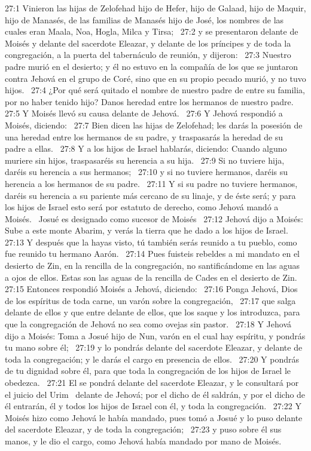 27:1 Vinieron las hijas de Zelofehad hijo de Hefer, hijo de Galaad, hijo de Maquir, hijo de Manasés, de las familias de Manasés hijo de José, los nombres de las cuales eran Maala, Noa, Hogla, Milca y Tirsa;  
27:2 y se presentaron delante de Moisés y delante del sacerdote Eleazar, y delante de los príncipes y de toda la congregación, a la puerta del tabernáculo de reunión, y dijeron:  
27:3 Nuestro padre murió en el desierto; y él no estuvo en la compañía de los que se juntaron contra Jehová en el grupo de Coré, sino que en su propio pecado murió, y no tuvo hijos.  
27:4 ¿Por qué será quitado el nombre de nuestro padre de entre su familia, por no haber tenido hijo? Danos heredad entre los hermanos de nuestro padre.  
27:5 Y Moisés llevó su causa delante de Jehová.  
27:6 Y Jehová respondió a Moisés, diciendo:  
27:7 Bien dicen las hijas de Zelofehad; les darás la posesión de una heredad entre los hermanos de su padre, y traspasarás la heredad de su padre a ellas.  
27:8 Y a los hijos de Israel hablarás, diciendo: Cuando alguno muriere sin hijos, traspasaréis su herencia a su hija.  
27:9 Si no tuviere hija, daréis su herencia a sus hermanos;  
27:10 y si no tuviere hermanos, daréis su herencia a los hermanos de su padre.  
27:11 Y si su padre no tuviere hermanos, daréis su herencia a su pariente más cercano de su linaje, y de éste será; y para los hijos de Israel esto será por estatuto de derecho, como Jehová mandó a Moisés.  
Josué es designado como sucesor de Moisés  
27:12 Jehová dijo a Moisés: Sube a este monte Abarim, y verás la tierra que he dado a los hijos de Israel.  
27:13 Y después que la hayas visto, tú también serás reunido a tu pueblo, como fue reunido tu hermano Aarón.  
27:14 Pues fuisteis rebeldes a mi mandato en el desierto de Zin, en la rencilla de la congregación, no santificándome en las aguas a ojos de ellos. Estas son las aguas de la rencilla de Cades en el desierto de Zin.  
27:15 Entonces respondió Moisés a Jehová, diciendo:  
27:16 Ponga Jehová, Dios de los espíritus de toda carne, un varón sobre la congregación,  
27:17 que salga delante de ellos y que entre delante de ellos, que los saque y los introduzca, para que la congregación de Jehová no sea como ovejas sin pastor.  
27:18 Y Jehová dijo a Moisés: Toma a Josué hijo de Nun, varón en el cual hay espíritu, y pondrás tu mano sobre él;  
27:19 y lo pondrás delante del sacerdote Eleazar, y delante de toda la congregación; y le darás el cargo en presencia de ellos.  
27:20 Y pondrás de tu dignidad sobre él, para que toda la congregación de los hijos de Israel le obedezca.  
27:21 El se pondrá delante del sacerdote Eleazar, y le consultará por el juicio del Urim  delante de Jehová; por el dicho de él saldrán, y por el dicho de él entrarán, él y todos los hijos de Israel con él, y toda la congregación.  
27:22 Y Moisés hizo como Jehová le había mandado, pues tomó a Josué y lo puso delante del sacerdote Eleazar, y de toda la congregación;  
27:23 y puso sobre él sus manos, y le dio el cargo, como Jehová había mandado por mano de Moisés.  
